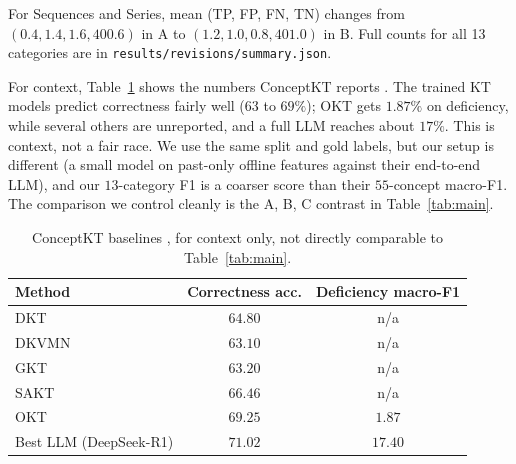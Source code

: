\documentclass[11pt]{article}
\newcommand{\code}[1]{\texttt{\small #1}}
\begin{document}
For Sequences and Series, mean (TP, FP, FN, TN) changes from
$(0.4,1.4,1.6,400.6)$ in A to $(1.2,1.0,0.8,401.0)$ in B.
Full counts for all 13 categories are in \code{results/revisions/summary.json}.


For context, Table~\ref{tab:context} shows the numbers ConceptKT reports
\cite{kang2026conceptkt}. The trained KT models predict correctness fairly well
($63$ to $69\%$); OKT gets $1.87\%$ on deficiency, while several others are unreported, and a
full LLM reaches about $17\%$. This is context, not a fair race. We use the same split
and gold labels, but our setup is different (a small model on past-only offline
features against their end-to-end LLM), and our $13$-category F1 is a coarser score than
their $55$-concept macro-F1. The comparison we control cleanly is the A, B, C contrast
in Table~\ref{tab:main}.

\begin{table}[t]
\centering
\caption{ConceptKT baselines \cite{kang2026conceptkt}, for context only, not directly
comparable to Table~\ref{tab:main}.}
\label{tab:context}
\small
\begin{tabular}{@{}lcc@{}}
\toprule
\textbf{Method} & \textbf{Correctness acc.} & \textbf{Deficiency macro-F1}\\
\midrule
DKT                       & $64.80$ & n/a\\
DKVMN                     & $63.10$ & n/a\\
GKT                       & $63.20$ & n/a\\
SAKT                      & $66.46$ & n/a\\
OKT                       & $69.25$ & $1.87$\\
Best LLM (DeepSeek-R1)    & $71.02$ & $17.40$\\
\bottomrule
\end{tabular}
\end{table}

\end{document}

